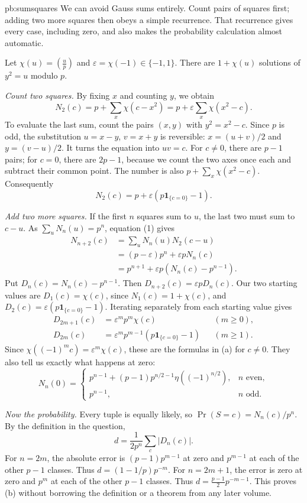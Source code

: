 \begin{solution}{pb:sumsquares}
\idea We can avoid Gauss sums entirely. Count pairs of squares first;
adding two more squares then obeys a simple recurrence.
That recurrence gives every case, including zero, and also
makes the probability calculation almost automatic.

\writeup Let $\chi(u)=\left(\frac up\right)$ and
$\varepsilon=\chi(-1)\in\{-1,1\}$.
There are $1+\chi(u)$ solutions of $y^2=u$ modulo $p$.

\emph{Count two squares.}
By fixing $x$ and counting $y$, we obtain
\[
N_2(c)=p+\sum_x\chi(c-x^2)
     =p+\varepsilon\sum_x\chi(x^2-c).
\]
To evaluate the last sum, count the pairs
$(x,y)$ with $y^2=x^2-c$. Since $p$ is odd,
the substitution $u=x-y$, $v=x+y$ is reversible:
$x=(u+v)/2$ and $y=(v-u)/2$. It turns the equation
into $uv=c$. For $c\ne0$, there are $p-1$ pairs;
for $c=0$, there are $2p-1$, because we count the
two axes once each and subtract their common point.
The number is also $p+\sum_x\chi(x^2-c)$.
Consequently
\[
N_2(c)=p+\varepsilon(p\mathbf1_{\{c=0\}}-1).
\tag{1}
\]

\emph{Add two more squares.}
If the first $n$ squares sum to $u$, the last
two must sum to $c-u$. As $\sum_uN_n(u)=p^n$,
equation (1) gives
\[
\begin{aligned}
N_{n+2}(c)
 &=\sum_uN_n(u)N_2(c-u)\\
 &=(p-\varepsilon)p^n+\varepsilon pN_n(c)\\
 &=p^{n+1}+\varepsilon p(N_n(c)-p^{n-1}).
\end{aligned}
\]
Put $D_n(c)=N_n(c)-p^{n-1}$. Then
$D_{n+2}(c)=\varepsilon pD_n(c)$.
Our two starting values are
$D_1(c)=\chi(c)$, since $N_1(c)=1+\chi(c)$,
and $D_2(c)=\varepsilon(p\mathbf1_{\{c=0\}}-1)$.
Iterating separately from each starting value gives
\[
\begin{aligned}
D_{2m+1}(c)&=\varepsilon^mp^m\chi(c)&& (m\ge0),\\
D_{2m}(c)&=\varepsilon^mp^{m-1}
       (p\mathbf1_{\{c=0\}}-1)&& (m\ge1).
\end{aligned}
\]
Since $\chi((-1)^mc)=\varepsilon^m\chi(c)$,
these are the formulas in (a) for $c\ne0$.
They also tell us exactly what happens at zero:
\[
N_n(0)=\begin{cases}
p^{n-1}+(p-1)p^{n/2-1}\eta((-1)^{n/2}),
  &n\text{ even},\\[2pt]
p^{n-1},&n\text{ odd}.
\end{cases}
\]

\emph{Now the probability.}
Every tuple is equally likely, so
$\Pr(S=c)=N_n(c)/p^n$. By the definition in
the question,
\[
d=\frac1{2p^n}\sum_c|D_n(c)|.
\]
For $n=2m$, the absolute error is
$(p-1)p^{m-1}$ at zero and $p^{m-1}$
at each of the other $p-1$ classes. Thus
$d=(1-1/p)p^{-m}$.
For $n=2m+1$, the error is zero at zero
and $p^m$ at each of the other $p-1$ classes.
Thus $d=\frac{p-1}2p^{-m-1}$.
This proves (b) without borrowing the definition
or a theorem from any later volume.


\end{solution}
